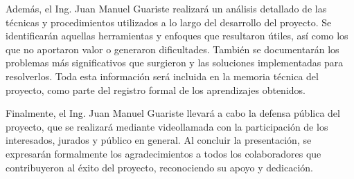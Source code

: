 \documentclass[
11pt, %
]{charter}
\begin{document}
Además, el Ing. Juan Manuel Guariste realizará un análisis detallado de las técnicas y procedimientos utilizados a lo largo del desarrollo del proyecto. Se identificarán aquellas herramientas y enfoques que resultaron útiles, así como los que no aportaron valor o generaron dificultades. También se documentarán los problemas más significativos que surgieron y las soluciones implementadas para resolverlos. Toda esta información será incluida en la memoria técnica del proyecto, como parte del registro formal de los aprendizajes obtenidos.

Finalmente, el Ing. Juan Manuel Guariste llevará a cabo la defensa pública del proyecto, que se realizará mediante videollamada con la participación de los interesados, jurados y público en general. Al concluir la presentación, se expresarán formalmente los agradecimientos a todos los colaboradores que contribuyeron al éxito del proyecto, reconociendo su apoyo y dedicación.
\end{document}
